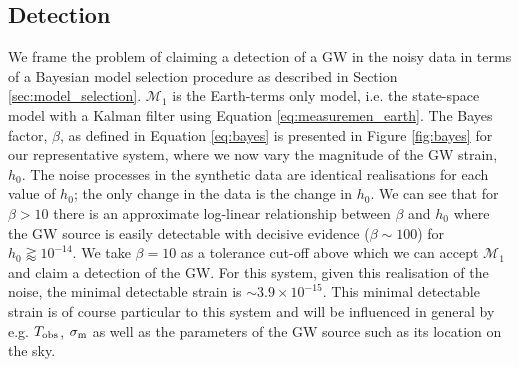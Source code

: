 \documentclass[fleqn,usenatbib,useAMS]{mnras}
\begin{document}
\subsection{Detection} \label{sec:detection}
We frame the problem of claiming a detection of a GW in the noisy data in terms of a Bayesian model selection procedure as described in Section \ref{sec:model_selection}. $\mathcal{M}_1$ is the Earth-terms only model, i.e. the state-space model with a Kalman filter using Equation \eqref{eq:measuremen_earth}. The Bayes factor, $\beta$, as defined in Equation \eqref{eq:bayes} is presented in Figure \ref{fig:bayes} for our representative system, where we now vary the magnitude of the GW strain, $h_0$. The noise processes in the synthetic data are identical realisations for each value of $h_0$; the only change in the data is the change in $h_0$. We can see that for $\beta >10$ there is an approximate log-linear relationship between $\beta$ and $h_0$ where the GW source is easily detectable with decisive evidence ($\beta \sim 100$) for $h_0 \gtrapprox 10^{-14}$. We take $\beta = 10$ as a tolerance cut-off above which we can accept $\mathcal{M}_1$ and claim a detection of the GW. For this system, given this realisation of the noise, the minimal detectable strain is $\sim 3.9 \times 10^{-15}$. This minimal detectable strain is of course particular to this system and will be influenced in general by e.g. $T_{\rm obs}$, $\sigma_{\rm m}$ as well as the parameters of the GW source such as its location on the sky. \newline 
\end{document}
